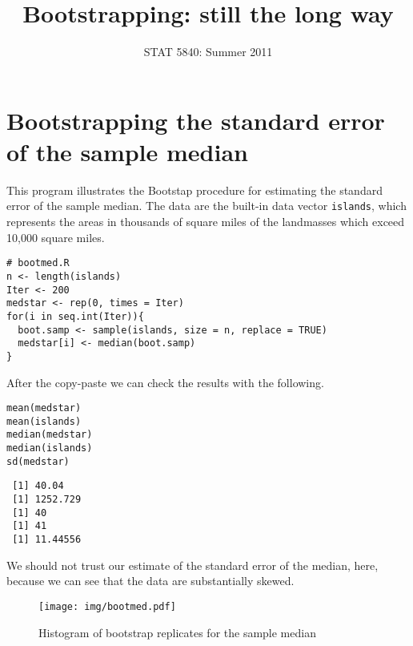 \documentclass[11pt,english]{article}
\title{Bootstrapping: still the long way}
\date{STAT 5840: Summer 2011}
\begin{document}
\maketitle

\thispagestyle{empty}

\section*{Bootstrapping the standard error of the sample median}
\label{sec-1}

This program illustrates the Bootstap procedure for estimating the standard error of the sample median.  The data are the built-in data vector \texttt{islands}, which represents the areas in thousands of square miles of the landmasses which exceed 10,000 square miles.




\begin{verbatim}
# bootmed.R
n <- length(islands)     
Iter <- 200
medstar <- rep(0, times = Iter)
for(i in seq.int(Iter)){
  boot.samp <- sample(islands, size = n, replace = TRUE)
  medstar[i] <- median(boot.samp)
}
\end{verbatim}




After the copy-paste we can check the results with the following.

\begin{verbatim}
mean(medstar)
mean(islands)
median(medstar)
median(islands)
sd(medstar)
\end{verbatim}




\begin{verbatim}
 [1] 40.04
 [1] 1252.729
 [1] 40
 [1] 41
 [1] 11.44556
\end{verbatim}


We should not trust our estimate of the standard error of the median, here, because we can see that the data are substantially skewed.




\begin{figure}[h!]
\centering
\texttt{[image: img/bootmed.pdf]}
\caption{\label{fig:yplot}Histogram of bootstrap replicates for the sample median}
\end{figure}
\end{document}
